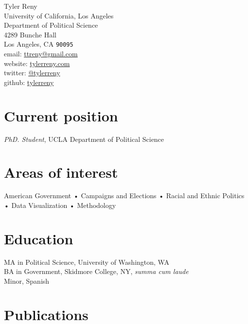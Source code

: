 \documentclass[11pt, a4paper]{article}
\newcommand{\years}[1]{\marginnote{\scriptsize #1}}
\begin{document}
{\LARGE Tyler Reny}\\[1cm]
 University of California, Los Angeles\\
 Department of Political Science\\
 4289 Bunche Hall\\
 Los Angeles, CA \texttt{90095}\\
email: \href{mailto:ttreny@gmail.com}{ttreny@gmail.com}\\
website: \href{http://www.tylerreny.com}{tylerreny.com}\\ 
twitter: \href{http://www.twitter.com/tylerreny}{@tylerreny}\\ 
github: \href{https://github.com/tylerreny}{tylerreny}\\ 

\section*{Current position}
\emph{PhD. Student}, UCLA Department of Political Science

\section*{Areas of interest}
 American Government • Campaigns and Elections • Racial and Ethnic Politics • Data Visualization • Methodology


\section*{Education}
\years{2015}\textsc{MA} in Political Science, University of Washington, WA\\
\years{2011}\textsc{BA} in Government, Skidmore College, NY, \textit{summa cum laude}\\
Minor, Spanish


\section*{Publications}
\end{document}
